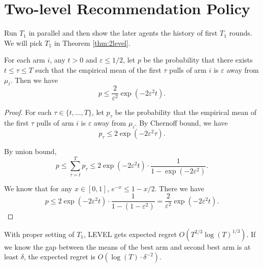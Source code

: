 \section{Two-level Recommendation Policy}
Run $T_1$ \ALGG in parallel and then show the later agents the history of first $T_1$ rounds. We will pick $T_1$ in Theorem \ref{thm:2level}. 

\begin{lemma}
\label{lem:2level1}
For each arm $i$, any $t > 0$ and $\varepsilon \leq 1/2$, let $p$ be the probability that there exists $t \leq \tau \leq T$ such that the empirical mean of the first $\tau$ pulls of arm $i$ is $\varepsilon$ away from $\mu_i$. Then we have 
\[
p \leq \frac{2}{\varepsilon^2} \exp(-2\varepsilon^2 t).
\]
\end{lemma}

\begin{proof}
For each $\tau \in \{t,...,T\}$, let $p_{\tau}$ be the probability that the empirical mean of the first $\tau$ pulls of arm $i$ is $\varepsilon$ away from $\mu_i$. By Chernoff bound, we have
\[
p_{\tau} \leq 2 \exp(-2\varepsilon^2 \tau).
\]

By union bound,
\[
p \leq \sum_{\tau = t}^T p_{\tau} \leq 2 \exp(-2\varepsilon^2 t)  \cdot \frac{1}{1-\exp(-2\varepsilon^2)}.
\]

We know that for any $ x \in [0,1]$, $e^{-x} \leq 1-x/2$. There we have
\[
p \leq  2 \exp(-2\varepsilon^2 t)  \cdot \frac{1}{1-(1-\varepsilon^2)} =  \frac{2}{\varepsilon^2} \exp(-2\varepsilon^2 t).
\]
\end{proof}

\begin{theorem}
\label{thm:2level}
With proper setting of $T_1$, \2LEVEL gets expected regret $O(T^{2/3} \log(T)^{1/3})$. If we know the gap between the means of the best arm and second best arm is at least $\delta$, the expected regret is $O(\log(T) \cdot \delta^{-2})$. 
\end{theorem}

